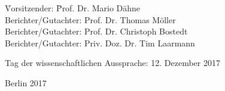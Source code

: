 \begin{fullsizetitle}
{\begin{tabbing}
%
\hspace{22mm}\= Vorsitzender:\hspace{20mm} \= Prof. Dr. Mario Dähne \\
\>Berichter/Gutachter: \> Prof. Dr. Thomas Möller \\
\>Berichter/Gutachter: \> Prof. Dr. Christoph Bostedt \\
\>Berichter/Gutachter: \> Priv. Doz. Dr. Tim Laarmann
%
\end{tabbing}
%
\leavevmode
\hspace{22mm}
Tag der wissenschaftlichen Aussprache: 12. Dezember 2017
}
%
\begin{center}
%
\vspace{20mm}
%
{\large %
Berlin 2017}
%
\end{center}
%
\end{fullsizetitle}
%
%